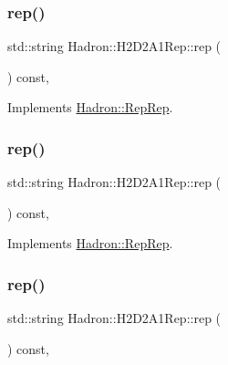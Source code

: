 \subsubsection{\texorpdfstring{rep()}{rep()}\hspace{0.1cm}{\footnotesize\ttfamily [2/5]}}
{\footnotesize\ttfamily std\+::string Hadron\+::\+H2\+D2\+A1\+Rep\+::rep (\begin{DoxyParamCaption}{ }\end{DoxyParamCaption}) const\hspace{0.3cm}{\ttfamily [inline]}, {\ttfamily [virtual]}}



Implements \mbox{\hyperlink{structHadron_1_1RepRep_ab3213025f6de249f7095892109575fde}{Hadron\+::\+Rep\+Rep}}.

\mbox{\label{structHadron_1_1H2D2A1Rep_a3280d932c7c579f85dedbde3a8e0f36f}} 
\subsubsection{\texorpdfstring{rep()}{rep()}\hspace{0.1cm}{\footnotesize\ttfamily [3/5]}}
{\footnotesize\ttfamily std\+::string Hadron\+::\+H2\+D2\+A1\+Rep\+::rep (\begin{DoxyParamCaption}{ }\end{DoxyParamCaption}) const\hspace{0.3cm}{\ttfamily [inline]}, {\ttfamily [virtual]}}



Implements \mbox{\hyperlink{structHadron_1_1RepRep_ab3213025f6de249f7095892109575fde}{Hadron\+::\+Rep\+Rep}}.

\mbox{\label{structHadron_1_1H2D2A1Rep_a3280d932c7c579f85dedbde3a8e0f36f}} 
\subsubsection{\texorpdfstring{rep()}{rep()}\hspace{0.1cm}{\footnotesize\ttfamily [4/5]}}
{\footnotesize\ttfamily std\+::string Hadron\+::\+H2\+D2\+A1\+Rep\+::rep (\begin{DoxyParamCaption}{ }\end{DoxyParamCaption}) const\hspace{0.3cm}{\ttfamily [inline]}, {\ttfamily [virtual]}}



